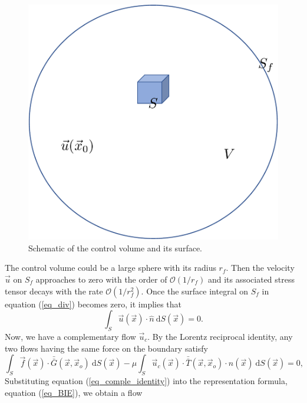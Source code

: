 \begin{figure}[h]
	\begin{center}
		\includegraphics[scale=0.4]{./figures/fig_dlp_volume}
		\vspace{0.5cm}
	\caption{Schematic of the control volume and its surface.}
	\label{fig_dlp_volume}
\end{center}
\end{figure}
The control volume could be a large sphere with its radius $r_f$. Then the velocity $\vec{u}$ on $S_f$ approaches to zero with the order of $\mathcal{O}(1/r_f)$ and its associated stress tensor decays with the rate $\mathcal{O} (1/r_f^2)$. Once the surface integral on $S_f$ in equation (\ref{eq_div}) becomes zero, it implies that
\[
\int_{S} \vec{u}(\vec{x}) \cdot \hat{n} \ \text{d}S(\vec{x}) = 0.
\]
Now, we have a complementary flow $\vec{u}_c$.  By the Lorentz reciprocal identity, any two flows having the same force on the boundary satisfy
\begin{equation}
	\int_{S}  \vec{f}(\vec{x}) \cdot \bar{\bar{G}}(\vec{x},\vec{x}_o) \ \text{d}S(\vec{x})  
	- \mu \int_S
	  \vec{u}_c(\vec{x}) \cdot  \bar{\bar{T}}(\vec{x},\vec{x}_o) 
	  \cdot \hat{n} ( \vec{x})
	  \ \text{d}S(\vec{x})
	  =0,
	  \label{eq_comple_identity}
\end{equation}
Substituting equation (\ref{eq_comple_identity}) into the representation formula, equation (\ref{eq_BIE}), we obtain a flow
